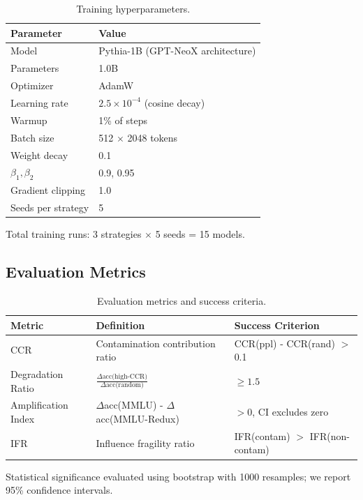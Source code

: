 \begin{table}[h]
\centering
\begin{tabular}{@{}ll@{}}
\toprule
Parameter & Value \\
\midrule
Model & Pythia-1B (GPT-NeoX architecture) \\
Parameters & 1.0B \\
Optimizer & AdamW \\
Learning rate & $2.5 \times 10^{-4}$ (cosine decay) \\
Warmup & 1\% of steps \\
Batch size & 512 $\times$ 2048 tokens \\
Weight decay & 0.1 \\
$\beta_1, \beta_2$ & 0.9, 0.95 \\
Gradient clipping & 1.0 \\
Seeds per strategy & 5 \\
\bottomrule
\end{tabular}
\caption{Training hyperparameters.}
\end{table}

Total training runs: 3 strategies $\times$ 5 seeds = 15 models.

\subsection{Evaluation Metrics}

\begin{table}[h]
\centering
\begin{tabular}{@{}lll@{}}
\toprule
Metric & Definition & Success Criterion \\
\midrule
CCR & Contamination contribution ratio & CCR(ppl) - CCR(rand) $>$ 0.1 \\
Degradation Ratio & $\frac{\Delta\text{acc(high-CCR)}}{\Delta\text{acc(random)}}$ & $\geq 1.5$ \\
Amplification Index & $\Delta$acc(MMLU) - $\Delta$acc(MMLU-Redux) & $> 0$, CI excludes zero \\
IFR & Influence fragility ratio & IFR(contam) $>$ IFR(non-contam) \\
\bottomrule
\end{tabular}
\caption{Evaluation metrics and success criteria.}
\end{table}

Statistical significance evaluated using bootstrap with 1000 resamples; we report 95\% confidence intervals.
